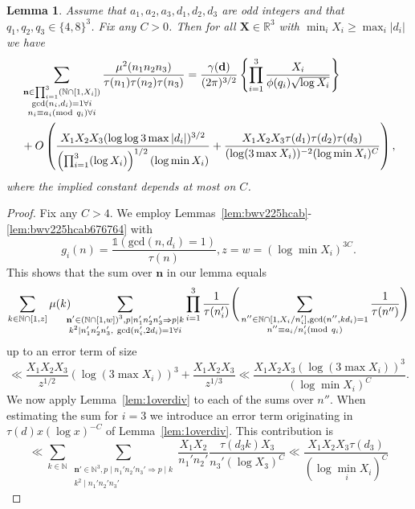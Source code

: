 \documentclass[a4paper,12pt,reqno]{amsart}
\numberwithin{equation}{section} \numberwithin{figure}{section}
\newcommand\N{\mathbb{N}}
\newcommand\R{\mathbb{R}}
\newcommand{\md}[1]{  \left(\textnormal{mod}\ #1\right)}
\renewcommand{\l}{\left}
\renewcommand{\r}{\right}
\renewcommand{\b}{\mathbf}
\renewcommand{\gcd}{\textrm{gcd}}
\renewcommand{\geq}{\geqslant}
\renewcommand{\#}{\sharp}
\newtheorem{lemma}{Lemma}
\theoremstyle{definition}
\numberwithin{lemma}{section}
\begin{document}
\begin{lemma}
\label{lem:1overdivmultiple} Assume that $a_1,a_2,a_3, d_1,d_2,d_3 $ are odd integers
and that $q_1,q_2,q_3\in \{4,8\}^3$.
Fix any $C>0$.
Then for all $\b X \in \R^3$ with $\min_i X_i\geq  \max_i |d_i| $ we have
 \begin{align*}
&\sum_{\substack{ \b n \in \prod_{i=1}^3 (\N \cap [1,X_i] )   \\ \gcd(n_i ,d_i )=1 \forall i \\n_i\equiv a_i \md {q_i} \forall i  } }\frac{\mu^2(n_1n_2n_3) }{\tau(n_1)\tau(n_2)\tau(n_3)}
 = 
\frac{\gamma(\b d )}{(2\pi )^{3/2} }
\l\{
\prod_{i=1}^3 \frac{X_i }{\phi(q_i)\sqrt{  \log X_i}   }  \r\}  
\\&+
O\l(\frac{X_1X_2X_3(\log \log 3\max  |d_i|)^{3/2}}{\l(\prod_{i=1}^3 (\log X_i)\r)^{1/2} (\log \min X_i )} 
+\frac{X_1X_2X_3\tau(d_1   )\tau(d_2   )\tau(d_3   )
}{(\log (3\max X_i)  )^{-2}(\log \min  X_i)^C} \r),\end{align*}
where  the implied constant depends at most on $C$.
\end{lemma}\begin{proof}  Fix any $C>4$. We employ Lemmas~\ref{lem:bwv225hcab}-\ref{lem:bwv225hcab676764} with 
\[g_i(n)=\frac{\mathds 1(\gcd(n, d_i)=1)}{\tau(n)}, z=w=(\log \min X_i )^{3C}.\] This shows that the sum over $\b n $ in our lemma 
equals 
\[\sum_{\substack{ k\in \N \cap [1,z]  } } \mu(k)\hspace{-0,2cm}
 \sum_{\substack{ \b n' \in (\N\cap[1,w])^3, p\mid n_1'n_2'n_3' \Rightarrow p\mid k \\
k^2\mid n_1'n_2'n_3' ,\ 
\gcd(n_i',2d_i )=1 \forall i } } 
 \prod_{i=1}^3\frac{1}{\tau( n_i')} \Bigg(
\sum_{\substack{  n'' \in \N \cap [1, X_i/n'_i],  \gcd(n'',kd_i)=1
  \\   n'' \equiv a_i/n'_i \md {q_i} }}\frac{1}{\tau(n'')}
  \Bigg)\]
up to an error term of size
\[\ll \frac{X_1X_2X_3}{z^{1/2} }(\log (3\max X_i)  )^3+\frac{X_1X_2X_3}{z^{1/3} } 
  \ll \frac{X_1X_2X_3(\log (3\max X_i)  )^3}{(\log \min X_i )^{C} }  .\]
We now   apply Lemma~\ref{lem:1overdiv} to each of the sums over $n''$. When estimating the sum for $i=3$
 we introduce an error term originating in $\tau(d) x (\log x )^{-C}$ of Lemma~\ref{lem:1overdiv}. This contribution 
is  \[\ll \sum_{k\in \N} \sum_{\substack{ \b n' \in \N^3, p\mid n_1'n_2'n_3' \Rightarrow p\mid k \\
k^2\mid n_1'n_2'n_3'  } } 
\frac{X_1X_2}{n_1'n_2'} \frac{\tau(d_3 k )X_3}{n_3' (\log X_3)^C}
\ll 
\frac{X_1X_2X_3\tau(d_3   )}{(\log \min_i X_i)^C}
\]
\end{proof}
\end{document}
